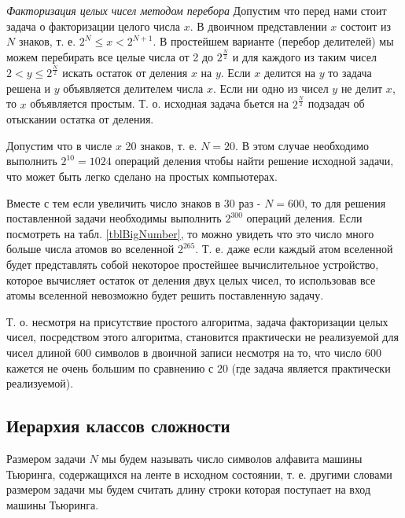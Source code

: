\begin{example}
\emph{Факторизация целых чисел методом перебора}
\label{exAddAlgoTrialDivision}
Допустим что перед нами стоит задача о факторизации целого числа $x$. В
двоичном представлении $x$ состоит из $N$ знаков, т. е. 
$2^N \le x < 2^{N+1}$. В простейшем варианте (перебор делителей) мы
можем перебирать все целые числа от 2 до $2^{\frac{N}{2}}$ и для
каждого из таким чисел $2 < y \le 2^{\frac{N}{2}}$ искать остаток от
деления $x$ на $y$. Если $x$ делится на $y$ то задача решена и $y$
объявляется делителем числа $x$. Если ни одно из чисел $y$ не делит
$x$, то $x$ объявляется простым.
Т. о. исходная задача бьется на $2^{\frac{N}{2}}$ подзадач об отыскании
остатка от деления.

Допустим что в числе $x$ 20 знаков, т. е. $N=20$. В этом случае
необходимо выполнить $2^{10} = 1024$ операций деления чтобы найти
решение исходной задачи, что может быть легко сделано на простых
компьютерах. 

Вместе с тем если увеличить число знаков в 30 раз - $N=600$, то для
решения поставленной задачи необходимы выполнить $2^{300}$ операций
деления. Если посмотреть на табл. \ref{tblBigNumber}, то можно увидеть
что это число много больше числа атомов во вселенной
$2^{265}$. Т. е. даже если каждый атом вселенной будет представлять
собой некоторое простейшее вычислительное устройство, которое
вычисляет остаток от деления двух целых чисел, то использовав все
атомы вселенной невозможно будет решить поставленную задачу. 

Т. о. несмотря на присутствие простого алгоритма, задача факторизации
целых чисел, посредством этого алгоритма, становится практически
не реализуемой для чисел длиной $600$ символов в двоичной записи
несмотря на то, что число $600$ кажется не очень большим по сравнению
с $20$ (где задача является практически реализуемой).
\end{example}


\subsection{Иерархия классов сложности}

\begin{definition}
Размером задачи $N$ мы будем называть число символов алфавита машины
Тьюринга, содержащихся на ленте в исходном состоянии, т. е. другими
словами размером задачи мы будем считать длину строки которая
поступает на вход машины Тьюринга.
\end{definition}

